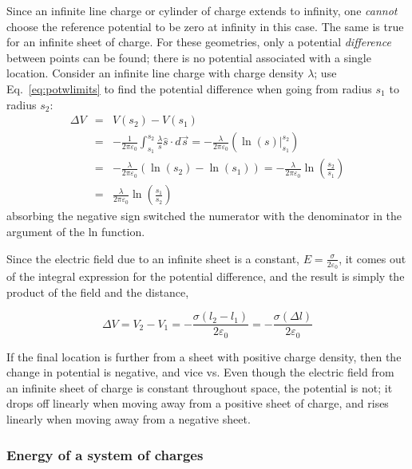 \documentclass[12pt]{article}
\begin{document}
\begin{flushleft}
Since an infinite line charge or cylinder of charge extends to infinity, one {\it cannot} choose the reference potential to be zero at infinity in this case.  The same is true for an infinite sheet of charge.  For these geometries, only a potential {\it difference} between points can be found; there is no potential associated with a single location.  Consider an infinite line charge with charge density $\lambda$; use  Eq.~\ref{eq:potwlimits} to find the potential difference when going from radius $s_{1}$ to radius $s_{2}$:
\begin{eqnarray}
\Delta V & = & V(s_{2}) - V(s_{1}) \nonumber \\
& = & - \frac{1}{2\pi \varepsilon_{0}}\int_{s_{1}}^{s_{2}}  \frac{\lambda}{s} \hat{s} \cdot  d\vec{s} 
   = - \frac{\lambda}{2\pi \varepsilon_{0}} \left( \left. \ln{(s)} \right\vert_{s_{1}}^{s_{2}} \right)  \nonumber \\
   & = &  -\frac{\lambda}{2\pi \varepsilon_{0}} \left( \ln{ ( s_{2} ) } - \ln{ ( s_{1} ) } \right) 
  =  -\frac{\lambda}{2\pi \varepsilon_{0}} \ln{ \left(\frac{ s_{2}}{ s_{1} } \right) } \nonumber \\
   & = & \frac{\lambda}{2\pi \varepsilon_{0}} \ln{ \left(\frac{ s_{1}}{ s_{2} } \right) }
\label{eq:vline}
\end{eqnarray}
absorbing the negative sign switched the numerator with the denominator in the argument of the ln function.

Since the electric field due to an infinite sheet is a constant, $E=\frac{\sigma}{2\varepsilon_{0}}$, it comes out of the integral expression for the potential difference, and the result is simply the product of the field and the distance,

\[
\Delta V = V_{2}-V_{1} = -\frac{\sigma(l_{2}-l_{1})}{2\varepsilon_{0}} = -\frac{\sigma(\Delta l)}{2\varepsilon_{0}}
\] 

If the final location is further from a sheet with positive charge density, then the change in potential is negative, and vice vs.  Even though the electric field from an infinite sheet of charge is constant throughout space, the potential is not; it drops off linearly when moving away from a positive sheet of charge, and rises linearly when moving away from a negative sheet.

\subsubsection*{\bf Energy of a system of charges}


\end{flushleft}
\end{document}
